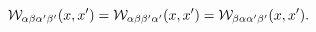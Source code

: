 \begin{equation}
{\cal W}_{\alpha\beta \alpha'\beta'}(x,x')={\cal W}_{\alpha\beta
\beta'\alpha '}(x,x')={\cal W}_{\beta\alpha\alpha'\beta'}(x,x').
\end{equation}

